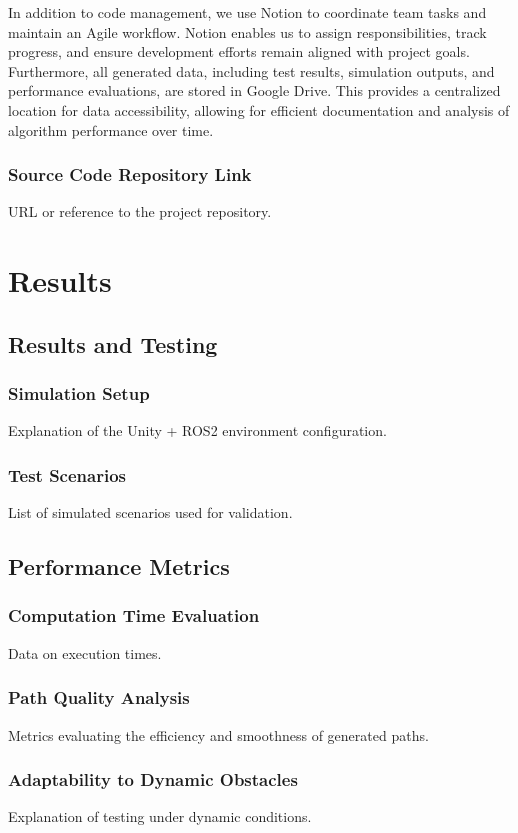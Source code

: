 \documentclass[a4paper,11pt]{report}
\begin{document}
In addition to code management, we use Notion to coordinate team tasks and maintain an Agile workflow. Notion enables us to assign responsibilities, track progress, and ensure development efforts remain aligned with project goals. Furthermore, all generated data, including test results, simulation outputs, and performance evaluations, are stored in Google Drive. This provides a centralized location for data accessibility, allowing for efficient documentation and analysis of algorithm performance over time.

\subsection{Source Code Repository Link}
URL or reference to the project repository.

\newpage

\chapter{Results}
\section{Results and Testing}
\subsection{Simulation Setup}
Explanation of the Unity + ROS2 environment configuration.

\subsection{Test Scenarios}
List of simulated scenarios used for validation.

\section{Performance Metrics}
\subsection{Computation Time Evaluation}
Data on execution times.

\subsection{Path Quality Analysis}
Metrics evaluating the efficiency and smoothness of generated paths.

\subsection{Adaptability to Dynamic Obstacles}
Explanation of testing under dynamic conditions.
\end{document}
